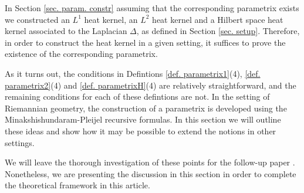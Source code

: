 \documentclass[11pt,reqno]{amsart}
\theoremstyle{remark}
\theoremstyle{definition}
\numberwithin{theorem}{section} \numberwithin{equation}{section}
\begin{document}
In Section \ref{sec. param. constr} assuming that the corresponding parametrix exists we constructed an $L^1$ heat kernel, an $L^2$ heat kernel and
a Hilbert space heat kernel associated to the Laplacian $\Delta$, as defined in Section \ref{sec. setup}.
Therefore, in order to construct the heat kernel in a given setting, it suffices to prove the existence of the corresponding parametrix.

As it turns out, the conditions in Defintions \ref{def. parametrix1}(4), \ref{def. parametrix2}(4) and \ref{def. parametrixH}(4) are
relatively straightforward, and the remaining
conditions for each of these defintions are not.  In the setting of Riemannian geometry, the construction of a parametrix is developed
using the Minakshishundaram-Pleijel recursive formulas.  In this section we will outline these ideas and show how it may be possible to
extend the notions in other settings.

We will leave the thorough investigation of these points for the follow-up paper \cite{JJS26}.  Nonetheless, we are presenting the discussion in this section
in order to complete the theoretical framework in this article.
\end{document}
